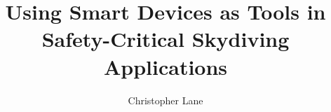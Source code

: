 \title{Using Smart Devices as Tools in Safety-Critical Skydiving Applications}
\author{Christopher Lane}

\maketitle
